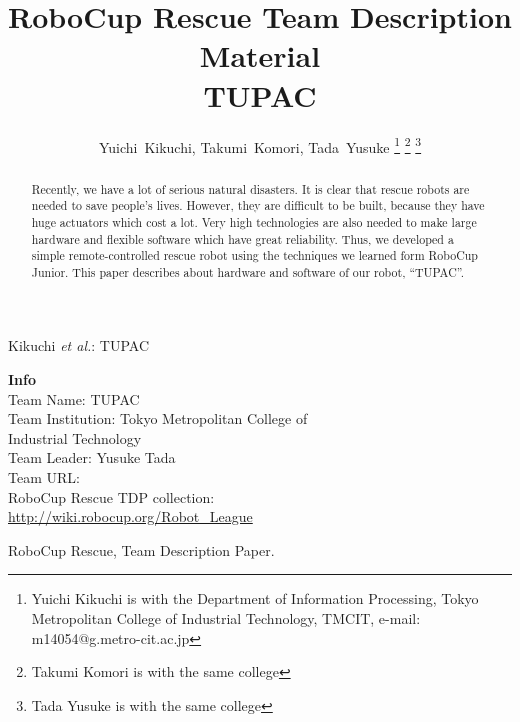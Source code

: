 \documentclass[journal]{IEEEtran}
\DeclareRobustCommand{\TMCIT}{Tokyo Metropolitan College of Industrial Technology}
\begin{document}
\title{RoboCup Rescue Team Description Material \\
 TUPAC}
 \author{Yuichi~Kikuchi,
        Takumi~Komori,
        Tada~Yusuke%
\thanks{Yuichi Kikuchi is with the Department
of Information Processing, \TMCIT, TMCIT, e-mail: m14054@g.metro-cit.ac.jp}%
\thanks{Takumi Komori is with the same college}%
\thanks{Tada Yusuke is with the same college}%
}
%
{Kikuchi \MakeLowercase{\textit{et al.}}: TUPAC}
\maketitle

\begin{flushleft}
\textbf{Info}\\
\hspace{10pt} Team Name: \hfill TUPAC\\
\hspace{10pt} Team Institution: \hfill Tokyo Metropolitan College of\\
\hfill Industrial Technology\\
\hspace{10pt} Team Leader: \hfill Yusuke Tada\\
\hspace{10pt} Team URL: \hfill %
\\
\vspace{5pt}
\hspace{10pt} RoboCup Rescue TDP collection: \\
\hfill \url{http://wiki.robocup.org/Robot_League}
\end{flushleft}

\begin{abstract}
Recently, we have a lot of serious natural disasters.
It is clear that rescue robots are needed to save people's lives.
However, they are difficult to be built, because they have huge actuators which cost a lot.
Very high technologies are also needed to make large hardware and flexible software which have great reliability.
Thus, we developed a simple remote-controlled rescue robot using the techniques we learned form RoboCup Junior.
This paper describes about hardware and software of our robot, ``TUPAC''.
\end{abstract}

\begin{IEEEkeywords}
RoboCup Rescue, Team Description Paper. %
\end{IEEEkeywords}
\end{document}
